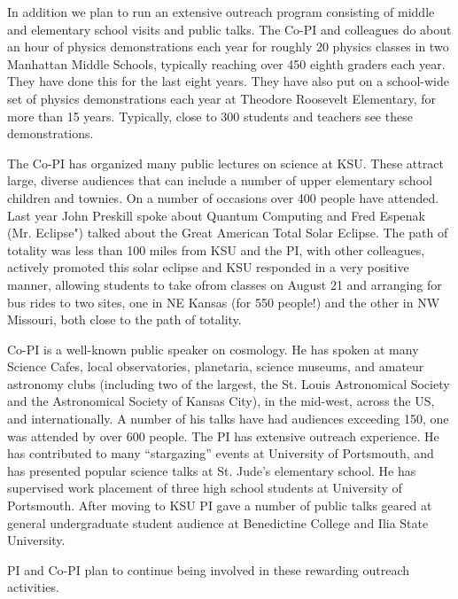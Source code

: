 In addition we plan to run an extensive outreach program consisting of middle
and elementary school visits and public talks. The Co-PI and colleagues do about
an hour of physics demonstrations each year for roughly 20 physics classes
in two Manhattan Middle Schools, typically reaching over 450 eighth
graders each year. They have done this for the last eight years. They have also
put on a school-wide set of physics demonstrations each year at Theodore
Roosevelt Elementary, for more than 15 years. Typically, close to 300 students
and teachers see these demonstrations.

The Co-PI has organized many public lectures on science at KSU. These attract
large, diverse audiences that can include a number of upper elementary school
children and townies. On a number of occasions over 400 people have attended.
Last year John Preskill spoke about Quantum Computing and Fred Espenak (Mr.
Eclipse") talked about the Great American Total Solar Eclipse. The path of
totality was less than 100 miles from KSU and the PI, with other colleagues,
actively promoted this solar eclipse and KSU responded in a very positive
manner, allowing students to take ofrom classes on August 21 and arranging for
bus rides to two sites, one in NE Kansas (for 550 people!) and the other in NW
Missouri, both close to the path of totality.

Co-PI is a well-known public speaker on cosmology. He has spoken at many
Science Cafes, local observatories, planetaria, science museums, and amateur
astronomy clubs (including two of the largest, the St. Louis Astronomical
Society and the Astronomical Society of Kansas City), in the mid-west, across
the US, and internationally. A number of his talks have had audiences exceeding
150, one was attended by over 600 people. The PI has extensive outreach
experience. He has contributed to many ``stargazing'' events at University of
Portsmouth, and has presented popular science talks at St. Jude's elementary
school. He has supervised work placement of three high school students at
University of Portsmouth. After moving to KSU PI gave a number of public talks
geared at general undergraduate student audience at Benedictine College and
Ilia State University.

PI and Co-PI plan to continue being involved in these rewarding outreach
activities.
